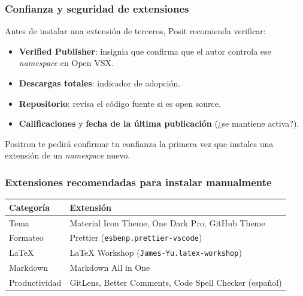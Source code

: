 \documentclass[
  doc,
  floatsintext,
  longtable,
  a4paper,
  nolmodern,
  notxfonts,
  notimes,
  12pt,
  colorlinks=true,linkcolor=blue,citecolor=blue,urlcolor=blue]{apa7}
\providecommand{\tightlist}{%
  \setlength{\itemsep}{0pt}\setlength{\parskip}{0pt}}
\newcounter{none} %
\begin{document}
\subsubsection{Confianza y seguridad de
extensiones}\label{confianza-y-seguridad-de-extensiones}

Antes de instalar una extensión de terceros, Posit recomienda verificar:

\begin{itemize}
\tightlist
\item
  \textbf{Verified Publisher}: insignia que confirma que el autor
  controla ese \emph{namespace} en Open VSX.
\item
  \textbf{Descargas totales}: indicador de adopción.
\item
  \textbf{Repositorio}: revisa el código fuente si es open source.
\item
  \textbf{Calificaciones} y \textbf{fecha de la última publicación} (¿se
  mantiene activa?).
\end{itemize}

Positron te pedirá confirmar tu confianza la primera vez que instales
una extensión de un \emph{namespace} nuevo.

\subsubsection{Extensiones recomendadas para instalar
manualmente}\label{extensiones-recomendadas-para-instalar-manualmente}

{\def\LTcaptype{none} %
\begin{longtable}[]{@{}
  >{\raggedright\arraybackslash}p{}
  >{\raggedright\arraybackslash}p{}@{}}
\toprule\noalign{}
\begin{minipage}[b]{\linewidth}\raggedright
Categoría
\end{minipage} & \begin{minipage}[b]{\linewidth}\raggedright
Extensión
\end{minipage} \\
\midrule\noalign{}
\endhead
\bottomrule\noalign{}
\endlastfoot
Tema & Material Icon Theme, One Dark Pro, GitHub Theme \\
Formateo & Prettier (\texttt{esbenp.prettier-vscode}) \\
LaTeX & LaTeX Workshop (\texttt{James-Yu.latex-workshop}) \\
Markdown & Markdown All in One \\
Productividad & GitLens, Better Comments, Code Spell Checker
(español) \\
\end{longtable}
}
\end{document}
